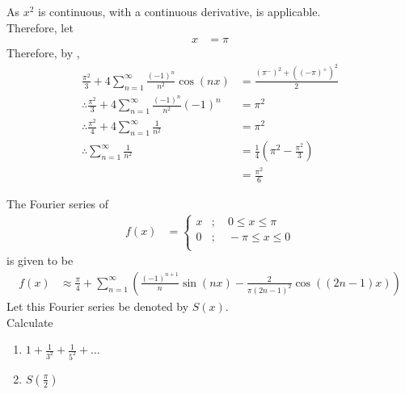 \documentclass[fleqn, a4paper, 12pt, twoside]{article}
\theoremstyle{definition}
\theoremstyle{theorem}
\begin{document}
\begin{solution}
	As $x^2$ is continuous, with a continuous derivative,  is applicable.\\
	Therefore, let
	\begin{align*}
		x & = \pi
	\end{align*}
	Therefore, by ,
	\begin{align*}
		\frac{\pi^2}{3} + 4 \sum\limits_{n = 1}^{\infty} \frac{(-1)^n}{n^2} \cos(n x)         & = \frac{\left( \pi^- \right)^2 + \left( \left( -\pi \right)^+ \right)^2}{2} \\
		\therefore \frac{\pi^2}{3} + 4 \sum\limits_{n = 1}^{\infty} \frac{(-1)^n}{n^2} (-1)^n & = \pi^2                                                                     \\
		\therefore \frac{\pi^2}{4} + 4 \sum\limits_{n = 1}^{\infty} \frac{1}{n^2}             & = \pi^2                                                                     \\
		\therefore \sum\limits_{n = 1}^{\infty} \frac{1}{n^2}                                 & = \frac{1}{4} \left( \pi^2 - \frac{\pi^2}{3} \right)                        \\
                                                                                                      & = \frac{\pi^2}{6}
	\end{align*}
\end{solution}

\begin{question}
	The Fourier series of
	\begin{align*}
		f(x) &=
			\begin{cases}
				x & ;\quad 0 \le x \le \pi  \\
				0 & ;\quad -\pi \le x \le 0 \\
			\end{cases}
	\end{align*}
	is given to be
	\begin{align*}
		f(x) & \approx \frac{\pi}{4} + \sum\limits_{n = 1}^{\infty} \left( \frac{(-1)^{n + 1}}{n} \sin(n x) - \frac{2}{\pi (2 n - 1)^2} \cos\left( (2 n - 1) x \right) \right)
	\end{align*}
	Let this Fourier series be denoted by $S(x)$.\\
	Calculate
	\begin{enumerate}
		\item $1 + \frac{1}{3^2} + \frac{1}{5^2} + \dots$
		\item $S\left( \frac{\pi}{2} \right)$
	\end{enumerate}
\end{question}
\end{document}
